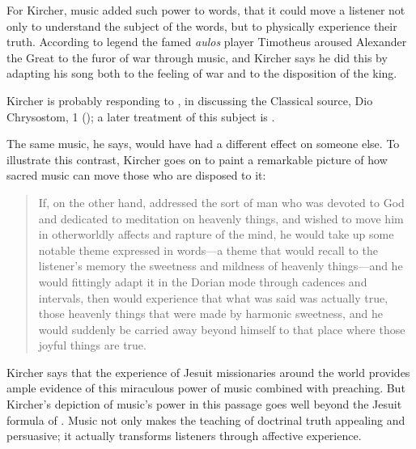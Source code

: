 For Kircher, music added such power to words, that it could move a listener not
only to understand the subject of the words, but to physically experience their
truth.
According to legend the famed \emph{aulos} player Timotheus aroused Alexander
the Great to the furor of war through music, and Kircher says he did this by
adapting his song both to the feeling of war and to the disposition of the
king.%
\begin{Footnote}
    Kircher is probably responding to \autocite[90]{Galilei:Dialogo}, in
    discussing the Classical source, Dio Chrysostom,  1
    (); a later treatment of this subject is
    \autocite{Dryden:Alexander}.
\end{Footnote}
The same music, he says, would have had a different effect on someone else.
To illustrate this contrast, Kircher goes on to paint a remarkable picture of
how sacred music can move those who are disposed to it:
\begin{quote}
    If, on the other hand,  addressed the sort of man who
    was devoted to God and dedicated to meditation on heavenly things, and
    wished to move him in otherworldly affects and rapture of the mind, he would
    take up some notable theme expressed in words---a theme that would recall to
    the listener's memory the sweetness and mildness of heavenly things---and he
    would fittingly adapt it in the Dorian mode through cadences and intervals,
    then  would experience that what was said was actually
    true, those heavenly things that were made by harmonic sweetness, and he
    would suddenly be carried away beyond himself to that place where those
    joyful things are true.%
        \Autocite[bk.~7, p.~550: .]
        {Kircher:Musurgia}
\end{quote}
Kircher says that the experience of Jesuit missionaries around the world
provides ample evidence of this miraculous power of music combined with
preaching.
But Kircher's depiction of music's power in this passage goes well beyond the
Jesuit formula of .%
    \Autocite
    [On the Jesuit approach to religious arts, see] [35--51]
    {Bailey:Art}
Music not only makes the teaching of doctrinal truth appealing and persuasive;
it actually transforms listeners through affective experience.

